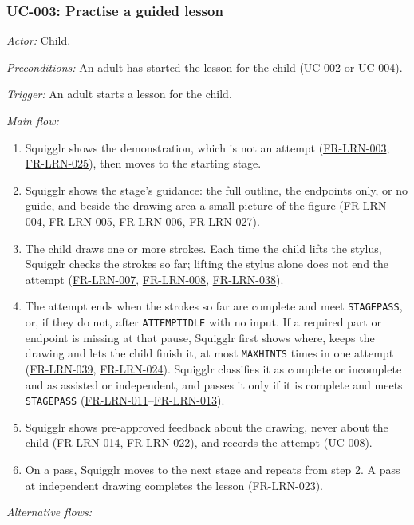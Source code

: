 \documentclass[12pt]{article}
\renewcommand{\_}{\textunderscore\allowbreak}%
\newcommand{\ucref}[1]{\hyperref[uc:#1]{\mbox{UC-#1}}}
\newcommand{\reqfield}[2]{\noindent\textit{#1:} #2\par}
\newcommand{\reqref}[1]{\hyperref[req:#1]{#1}}
\providecommand{\ucref}[1]{\hyperref[uc:#1]{UC-#1}}
\begin{document}
\subsubsection{UC-003: Practise a guided lesson}
\label{puc:003}
\reqfield{Actor}{Child.}
\reqfield{Preconditions}{An adult has started the lesson for the child
(\ucref{002} or \ucref{004}).}
\reqfield{Trigger}{An adult starts a lesson for the child.}
\noindent\textit{Main flow:}
\begin{enumerate}[nosep, leftmargin=2.2em]
  \item Squigglr shows the demonstration, which is not an attempt
  (\mbox{\reqref{FR-LRN-003}}, \mbox{\reqref{FR-LRN-025}}), then moves to the starting stage.
  \item Squigglr shows the stage's guidance: the full outline, the endpoints
  only, or no guide, and beside the drawing area a small picture of the
  figure (\mbox{\reqref{FR-LRN-004}}, \mbox{\reqref{FR-LRN-005}}, \mbox{\reqref{FR-LRN-006}}, \mbox{\reqref{FR-LRN-027}}).
  \item The child draws one or more strokes. Each time the child lifts the
  stylus, Squigglr checks the strokes so far; lifting the stylus alone does not
  end the attempt (\mbox{\reqref{FR-LRN-007}}, \mbox{\reqref{FR-LRN-008}}, \mbox{\reqref{FR-LRN-038}}).
  \item The attempt ends when the strokes so far are complete and meet
  \texttt{STAGE\_PASS}, or, if they do not, after \texttt{ATTEMPT\_IDLE} with
  no input. If a required part or endpoint is missing at that pause, Squigglr
  first shows where, keeps the drawing and lets the child finish it, at most
  \texttt{MAX\_HINTS} times in one attempt
  (\mbox{\reqref{FR-LRN-039}}, \mbox{\reqref{FR-LRN-024}}). Squigglr classifies it as complete or
  incomplete and as assisted or independent, and passes it only if it is
  complete and meets \texttt{STAGE\_PASS}
  (\mbox{\reqref{FR-LRN-011}}--\mbox{\reqref{FR-LRN-013}}).
  \item Squigglr shows pre-approved feedback about the drawing, never about the
  child (\mbox{\reqref{FR-LRN-014}}, \mbox{\reqref{FR-LRN-022}}), and records
  the attempt (\ucref{008}).
  \item On a pass, Squigglr moves to the next stage and repeats from step 2. A
  pass at independent drawing completes the lesson (\mbox{\reqref{FR-LRN-023}}).
\end{enumerate}
\noindent\textit{Alternative flows:}
\end{document}

